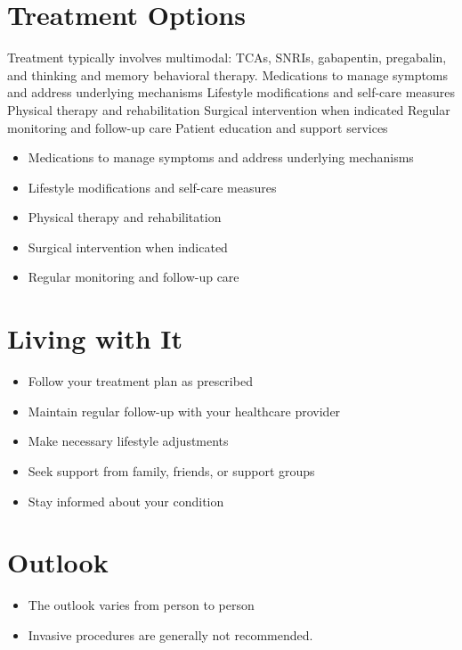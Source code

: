 \section{Treatment Options}
Treatment typically involves multimodal: TCAs, SNRIs, gabapentin, pregabalin, and thinking and memory behavioral therapy. Medications to manage symptoms and address underlying mechanisms Lifestyle modifications and self-care measures Physical therapy and rehabilitation Surgical intervention when indicated Regular monitoring and follow-up care Patient education and support services

\begin{itemize}[noitemsep]
  \item Medications to manage symptoms and address underlying mechanisms
  \item Lifestyle modifications and self-care measures
  \item Physical therapy and rehabilitation
  \item Surgical intervention when indicated
  \item Regular monitoring and follow-up care
\end{itemize}
\section{Living with It}
\begin{itemize}[noitemsep]
  \item Follow your treatment plan as prescribed
  \item Maintain regular follow-up with your healthcare provider
  \item Make necessary lifestyle adjustments
  \item Seek support from family, friends, or support groups
  \item Stay informed about your condition
\end{itemize}
\section{Outlook}
\begin{itemize}[noitemsep]
  \item The outlook varies from person to person
  \item Invasive procedures are generally not recommended.
\end{itemize}
